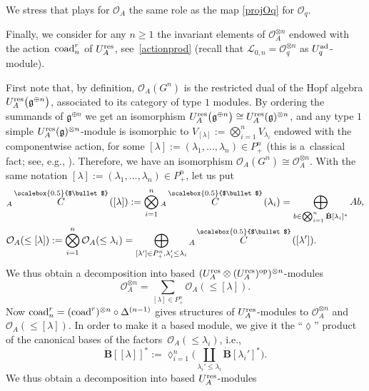 \documentclass[10pt,a4paper]{amsart}
\numberwithin{equation}{section}
\theoremstyle{definition}
\newcommand{\Ll}{{\mathcal L}}
\newcommand{\Oo}{{\mathcal O}}
\newcommand{\smallbullet}{%
\vcenter{\hbox{\,\scalebox{0.5}{$\bullet$}\,}}
}
\begin{document}
We stress that \smash{${}_A \overset{\smallbullet}{\tau}_{\mu,\nu}$} plays for $\Oo_A$ the same role as the map \eqref{projOq} for $\Oo_q$.

Finally, we consider for any $n\geq 1$ the invariant elements of $\Oo_A^{\otimes n}$ endowed with the action~${\rm coad}^r_n$ of $U_A^{\rm res}$, see~\eqref{actionprod} \big(recall that $\Ll_{0,n}=\Oo_q^{\otimes n}$ as $U_q^{\rm ad}$-module\big).

First note that, by definition, $\Oo_A(G^n)$ is the restricted dual of the Hopf algebra $U_A^{\rm res}\big(\mathfrak{g}^{\oplus n}\big)$, associated to its category of type $1$ modules. By ordering the summands of $\mathfrak{g}^{\oplus n}$ we get an isomorphism $U_A^{\rm res}\big(\mathfrak{g}^{\oplus n}\big)\cong U_A^{\rm res}(\mathfrak{g})^{\otimes n}$, and any type $1$ simple $U_A^{\rm res}(\mathfrak{g})^{\otimes n}$-module is isomorphic to ${V_{[\lambda]} := \bigotimes_{i=1}^n V_{\lambda_i}}$ endowed with the componentwise action, for some ${[\lambda] :=(\lambda_1,\dots, \lambda_n)\in P_+^n}$ (this is a~classical fact; see, e.g., \cite[Theorem~3.10.2]{Et}). Therefore, we have an isomorphism ${\Oo_A(G^n)\cong \Oo_A^{\otimes n}}$.
With the same notation $[\lambda]:=(\lambda_1,\dots, \lambda_n)\in P_+^n$, let us put
\begin{align*}%
&{}_A \overset{\raisebox{-1.5pt}{\scriptsize$\smallbullet$}}{C} ([\lambda]) := \bigotimes_{i=1}^n {}_A \overset{\raisebox{-1.5pt}{\scriptsize$\smallbullet$}}{C} (\lambda_i) = \bigoplus_{b\in \bigotimes_{i=1}^n \dot{\mathbf{B}}[\lambda_i]^*} Ab,\\
&\Oo_A(\leq [\lambda]) := \bigotimes_{i=1}^n \Oo_A(\leq \lambda_i)=\bigoplus_{[\lambda'] \in P_+^n, \lambda_i'\leq \lambda_i} {}_A \overset{\raisebox{-1.5pt}{\scriptsize$\smallbullet$}}{C} ([\lambda']).
\end{align*}
We thus obtain a decomposition into based $(U_A^{\rm res}\otimes (U_A^{\rm res})^{\rm op})^{\otimes n}$-modules
\[%
\Oo_A^{\otimes n} = \sum_{[\lambda] \in P_+^n} \Oo_A(\leq [\lambda]).
\]
Now ${\rm coad}_n^r = ({\rm coad}^r)^{\otimes n}\circ \Delta^{(n-1)}$ gives structures of $U_A^{\rm res}$-modules to $\Oo_A^{\otimes n}$ and $\Oo_A(\leq [\lambda])$. In order to make it a based module, we give it the ``$\lozenge$'' product of the canonical bases of the factors~${\Oo_A(\leq \lambda_i)}$, i.e.,
\[\dot{\mathbf{B}} [[\lambda]]^* := \lozenge_{i=1}^n \bigg(\coprod_{\lambda_i'\leq \lambda_i}\dot{\mathbf{B}} [\lambda_i']^*\bigg).\]
We thus obtain a decomposition into based $U_A^{\rm res}$-modules
\end{document}
